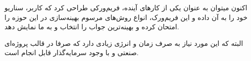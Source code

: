 اکنون میتوان به عنوان یکی از کارهای آینده، فریم‌ورکی طراحی کرد که کاربر، سناریو خود را به آن داده و این فریم‌ورک، انواع روش‌های مرسوم بهینه‌سازی در این حوزه را امتحان کرده و بهینه‌ترین جواب را انتخاب و به ما نمایش دهد.

البته که این مورد نیاز به صرف زمان و انرژی زیادی دارد که صرفا در قالب پروژه‌ای صنعتی و با وجود سرمایه‌گذار قابل انجام است.
\newpage
‌